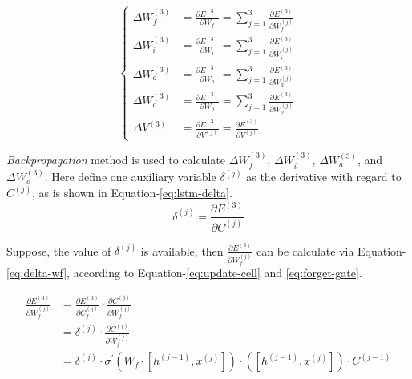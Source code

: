 \documentclass[english]{article}
\begin{document}
\begin{equation}\label{eq:lstm-delta-3}\begin{cases}
\Delta W^{(3)}_f &= \frac{\partial E^{(3)}}{\partial W_f} = {\sum\limits_{j=1}^3}\frac{\partial E^{(3)}}{\partial W^{(j)}_f} \\
\Delta W^{(3)}_i &= \frac{\partial E^{(3)}}{\partial W_i} = {\sum\limits_{j=1}^3}\frac{\partial E^{(3)}}{\partial W^{(j)}_i} \\
\Delta W^{(3)}_a &= \frac{\partial E^{(3)}}{\partial W_a} = {\sum\limits_{j=1}^3}\frac{\partial E^{(3)}}{\partial W^{(j)}_a} \\
\Delta W^{(3)}_o &= \frac{\partial E^{(3)}}{\partial W_o} = {\sum\limits_{j=1}^3}\frac{\partial E^{(3)}}{\partial W^{(j)}_o} \\
\Delta V^{(3)} &=\frac{\partial E^{(3)}}{\partial V^{(j)}} = \frac{\partial E^{(3)}}{\partial V^{(j)} }
\end{cases}\end{equation}

\textit{Backpropagation} method is used to calculate $\Delta W^{(3)}_f$,  $\Delta W^{(3)}_i$, $\Delta W^{(3)}_a$, and $\Delta W^{(3)}_o$. Here define one auxiliary variable $\delta^{(j)}$ as the derivative with regard to $C^{(j)}$, as is shown in Equation-\ref{eq:lstm-delta}. 
\begin{equation}\label{eq:lstm-delta}
\delta^{(j)} = \frac{\partial E^{(3)}}{\partial C^{(j)}}
\end{equation}

Suppose, the value of $\delta^{(j)}$  is available, then $\frac{\partial E^{(3)}}{\partial W^{(j)}_f}$ can be calculate via Equation-\ref{eq:delta-wf}, according to Equation-\ref{eq:update-cell} and \ref{eq:forget-gate}. 

\begin{equation}\label{eq:delta-wf}
\begin{split}
\frac{\partial E^{(3)}}{\partial W^{(j)}_f} &= \frac{\partial E^{(3)}}{\partial C^{(j)}_f} \cdot \frac{\partial C^{(j)}}{\partial W^{(j)}_f}  \\                                                       
                                                             &= \delta^{(j)} \cdot \frac{\partial C^{(j)}}{\partial W^{(j)}_f} \\
   &= \delta^{(j)} \cdot  \sigma^{\prime}(W_f \cdot [h^{(j-1)}, x^{(j)}]) \cdot ([h^{(j-1)}, x^{(j)}]) \cdot C^{(j-1)}  \\
\end{split}                                                             
\end{equation}
\end{document}
